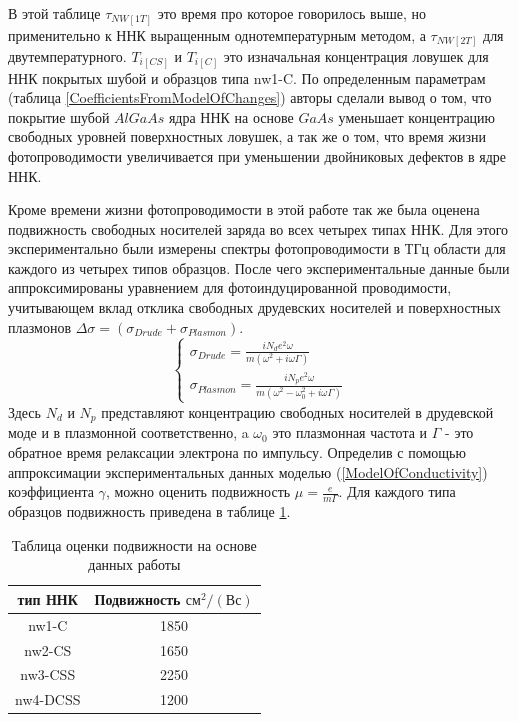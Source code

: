 \documentclass[a4paper,14pt,russian]{extreport}
\begin{document}
В этой таблице $\tau_{NW[1T]}$ это время про которое говорилось выше, но применительно к ННК выращенным однотемпературным методом, а $\tau_{NW[2T]}$ для двутемпературного. $T_{i[CS]}$ и $T_{i[C]}$ это изначальная концентрация ловушек для ННК покрытых шубой и образцов типа nw1-C.
По определенным параметрам (таблица \ref{CoefficientsFromModelOfChanges}) авторы \cite{CurrentLifetime} сделали вывод о том, что покрытие шубой $AlGaAs$ ядра ННК на основе $GaAs$ уменьшает концентрацию свободных уровней поверхностных ловушек, а так же о том, что время жизни фотопроводимости увеличивается при уменьшении двойниковых дефектов в ядре ННК.\par
				Кроме времени жизни фотопроводимости в этой работе так же была оценена подвижность свободных носителей заряда во всех четырех типах ННК. Для этого экспериментально были измерены спектры фотопроводимости в ТГц области для каждого из четырех типов образцов. После чего экспериментальные данные были аппроксимированы уравнением для фотоиндуцированной проводимости, учитывающем вклад отклика свободных друдевских носителей и поверхностных плазмонов $\Delta\sigma = (\sigma_{Drude} + \sigma_{Plasmon})$.
				\begin{equation}\label{ModelOfConductivity}
					\begin{cases}
					\sigma_{Drude} = \frac{i N_d e^2 \omega}{m(\omega^2 + i \omega \Gamma)} \\
					\sigma_{Plasmon} = \frac{i N_p e^2 \omega}{m(\omega^2 - \omega_0^2 + i \omega \Gamma)}
 					\end{cases}
				\end{equation}
				Здесь $N_d$ и $N_p$ представляют концентрацию свободных носителей в друдевской моде и в плазмонной соответственно, a $\omega_0$ это плазмонная частота и $\Gamma$ - это обратное время релаксации электрона по импульсу. Определив с помощью аппроксимации экспериментальных данных моделью (\ref{ModelOfConductivity}) коэффициента $\gamma$, можно оценить подвижность $\mu = \frac{e}{m \Gamma}$. Для каждого типа образцов подвижность приведена в таблице \ref{MobilityFromArtycle}.
\begin{table}[h]
\centering
\caption{Таблица оценки подвижности на основе данных работы \cite{CurrentLifetime}}
\label{MobilityFromArtycle}
\begin{tabular}{@{}cc@{}}
\toprule
тип ННК		& Подвижность  $\text{см}^2/(\text{В} \text{с})$\\
\midrule
nw1-C                           & 1850\\
nw2-CS             				& 1650\\
nw3-CSS             			& 2250\\
nw4-DCSS				   		& 1200\\
\bottomrule
\end{tabular}
\end{table}
\end{document}
